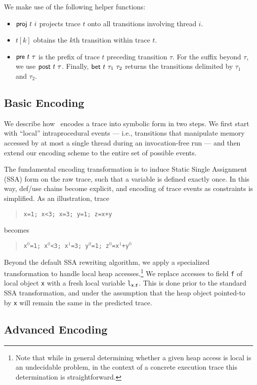 We make use of the following helper functions:
\begin{itemize}
	\item ${\sf proj}\ t\ i$ projects trace $t$ onto all transitions involving thread $i$.
	\item $t[k]$ obtains the $k$th transition within trace $t$.
	\item ${\sf pre}\ t\ \tau$ is the prefix of trace $t$ preceding transition $\tau$. For the suffix beyond $\tau$, we 
	use ${\sf post}\ t\ \tau$. Finally, ${\sf bet}\ t\ \tau_1\ \tau_2$ returns the transitions delimited by $\tau_1$ and $\tau_2$.
\end{itemize}

\subsection{Basic Encoding}

We describe how \tool\ encodes a trace into symbolic form in two steps. We first start with ``local'' intraprocedural events --- i.e., 
transitions that manipulate memory accessed by at most a single thread during an invocation-free run --- and then extend our encoding scheme to the entire set of possible events.

The fundamental encoding transformation is to induce Static Single Assignment (SSA) form on the raw trace, such that
a variable is defined exactly once. In this way, def/use chains become explicit, and encoding of trace events as constraints is simplified. As an illustration, trace
\begin{quote}
	{\tt x=1; x<3; x=3; y=1; z=x+y}
\end{quote}
becomes
\begin{quote}
	{\tt x$^0$=1; x$^0$<3; x$^1$=3; y$^0$=1; z$^0$=x$^1$+y$^0$}
\end{quote}

Beyond the default SSA rewriting algorithm, we apply a specialized transformation to handle local heap accesses.\footnote{
	Note that while in general determining whether a given heap access is local is an undecidable problem, in the context
	of a concrete execution trace this determination is straightforward.
} We replace accesses to field {\tt f} of local object {\tt x} with a fresh local variable {\tt l$_{\tt x.f}$}. This is done prior to the standard SSA transformation, and under the assumption that the heap object pointed-to by {\tt x} will remain the same in the predicted trace.

\subsection{Advanced Encoding}